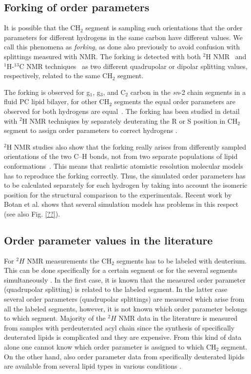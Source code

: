 \documentclass[aps,prl,superscriptaddress,twocolumn]{revtex4}
\begin{document}
\subsection{Forking of order parameters}

It is possible that the CH$_2$ segment is sampling such orientations that the order parameters
for different hydrogens in the same carbon have different values. We call this phenomena as 
{\it forking}, as done also previously to avoid confusion with splittings measured with NMR.
The forking is detected with both $^2$H NMR~\cite{seelig75,seelig78,engel81,gally81} and 
$^1$H-$^{13}$C NMR techniques~\cite{??} as two different quadrupolar or dipolar splitting values,
respectively, related to the same CH$_2$ segment.

The forking is observed for g$_1$, g$_3$, and  C$_2$ carbon in the \textit{sn}-2 chain segments in
a fluid PC lipid bilayer, for other CH$_2$ segments the equal order parameters are observed for 
both hydrogens are equal~\cite{seelig74,seelig77,seelig78,gally81,ferreira13,??}.
The forking has been studied in detail with $^2$H NMR techniques by separately deuterating the 
R or S position in CH$_2$ segment to assign order parameters to correct hydrogens \cite{gally81}.

$^2$H NMR studies also show that the forking really arises from differently sampled orientations 
of the two C--H bonds, not from two separate populations of lipid conformations~\cite{engel81,gally81}.
This means that realistic atomistic resolution molecular models has to reproduce the forking 
correctly. Thus, the simulated order parameters has to be calculated separately for each hydrogen
by taking into account the isomeric position for the structural comparison to the experimentals.
Recent work by Botan et al. shows that several simulation models has problems in this respect \cite{botan15}
(see also Fig. \ref{??}). 


\subsection{Order parameter values in the literature}
For $^2H$ NMR measurements the CH$_2$ segments has to be labeled with deuterium.
This can be done specifically for a certain segment or for the several segments
simultaneously \cite{??}. In the first case, it is known that the measured
order parameter (quadrupolar splitting) is related to the labeled segment.
In the latter case several order parameters (quadrupolar splittings) are
measured which arise from all the labeled segments, however, it is not known 
which order parameter belongs to which segment. Majority of the $^2H$ NMR data
in the literature is measured from samples with perdeuterated acyl chain \cite{leftin11}
since the synthesis of specifically deuterated lipids is complicated \cite{??} and they are expensive.
From this kind of data alone one cannot know which order parameter is assigned
to which CH$_2$ segment. On the other hand, also order parameter data from specifically 
deuterated lipids are available from several lipid types in various 
conditions \cite{seelig74,seelig75,seelig77,seelig78,gally81}.
\end{document}
